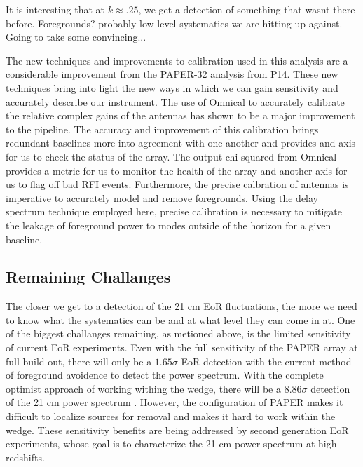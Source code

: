 \documentclass[twocolumn,numberedappendix]{emulateapj} \shorttitle{PSA64}
\begin{document}
It is interesting that at $k\approx.25$, we get a detection of something that
wasnt there before. Foregrounds? probably low level systematics we are hitting
up against. Going to take some convincing...

The new techniques and improvements to calibration used in this analysis are a
considerable improvement from the PAPER-32 analysis from P14.
These new techniques bring into light the new ways in
which we can gain sensitivity and accurately describe our instrument. The use of
Omnical to accurately calibrate the relative complex gains of the antennas has
shown to be a major improvement to the pipeline. The accuracy and improvement of
this calibration brings redundant baselines more into agreement with one another
and provides and axis for us to check the status of the array. The output 
chi-squared from Omnical provides a metric for us to monitor the health of the
array and another axis for us to flag off bad RFI events. Furthermore, the
precise calbration of antennas is imperative to accurately model and remove
foregrounds. Using the delay spectrum technique employed here, precise
calibration is necessary to mitigate the leakage of foreground power to modes
outside of the horizon for a given baseline. 



\subsection{Remaining Challanges}
The closer we get to a detection of the 21 cm EoR fluctuations, the more we need
to know what the systematics can be and at what level they can come in at. One
of the biggest challanges remaining, as metioned above, is the limited
sensitivity of current EoR experiments. Even with the full sensitivity of the
PAPER array at full build out, there will only be a $1.65\sigma$ EoR detection
with the current method of foreground avoidence to detect the power spectrum.
With the complete optimist approach of working withing the wedge, there will be
a $8.86\sigma$ detection of the 21 cm power spectrum \citep{pober_et_al2014}.
However, the configuration of PAPER makes it difficult to localize sources for
removal and makes it hard to work within the wedge. These sensitivity benefits
are being addressed by second generation EoR experiments, whose goal is to
characterize the 21 cm power spectrum at high redshifts.
\end{document}
